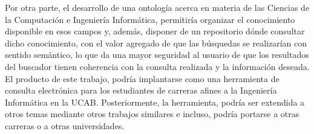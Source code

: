 Por otra parte, el desarrollo de una ontología acerca en materia de las Ciencias de la Computación e Ingeniería Informática, permitiría organizar el conocimiento disponible en esos campos y, además, disponer de un repositorio dónde consultar dicho conocimiento, con el valor agregado de que las búsquedas se realizarían con sentido semántico, lo que da una mayor seguridad al usuario de que los resultados del buscador tienen coherencia con la consulta realizada y la información deseada. El producto de este trabajo, podría implantarse como una herramienta de consulta electrónica para los estudiantes de carreras afines a la Ingeniería Informática en la UCAB. Posteriormente, la herramienta, podría ser extendida a otros temas mediante otros trabajos similares e incluso, podría portarse a otras carreras o a otras universidades.

\newpage
